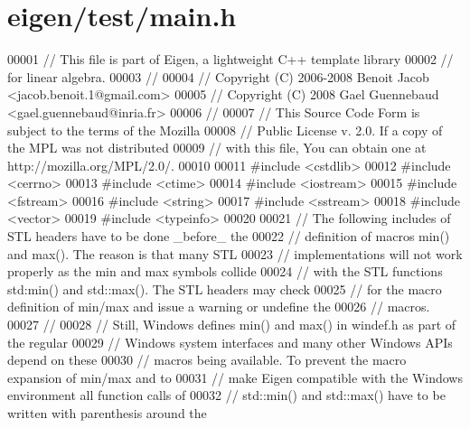 \hypertarget{eigen_2test_2main_8h_source}{}\section{eigen/test/main.h}
\label{eigen_2test_2main_8h_source}

\begin{DoxyCode}
00001 \textcolor{comment}{// This file is part of Eigen, a lightweight C++ template library}
00002 \textcolor{comment}{// for linear algebra.}
00003 \textcolor{comment}{//}
00004 \textcolor{comment}{// Copyright (C) 2006-2008 Benoit Jacob <jacob.benoit.1@gmail.com>}
00005 \textcolor{comment}{// Copyright (C) 2008 Gael Guennebaud <gael.guennebaud@inria.fr>}
00006 \textcolor{comment}{//}
00007 \textcolor{comment}{// This Source Code Form is subject to the terms of the Mozilla}
00008 \textcolor{comment}{// Public License v. 2.0. If a copy of the MPL was not distributed}
00009 \textcolor{comment}{// with this file, You can obtain one at http://mozilla.org/MPL/2.0/.}
00010 
00011 \textcolor{preprocessor}{#include <cstdlib>}
00012 \textcolor{preprocessor}{#include <cerrno>}
00013 \textcolor{preprocessor}{#include <ctime>}
00014 \textcolor{preprocessor}{#include <iostream>}
00015 \textcolor{preprocessor}{#include <fstream>}
00016 \textcolor{preprocessor}{#include <string>}
00017 \textcolor{preprocessor}{#include <sstream>}
00018 \textcolor{preprocessor}{#include <vector>}
00019 \textcolor{preprocessor}{#include <typeinfo>}
00020 
00021 \textcolor{comment}{// The following includes of STL headers have to be done \_before\_ the}
00022 \textcolor{comment}{// definition of macros min() and max().  The reason is that many STL}
00023 \textcolor{comment}{// implementations will not work properly as the min and max symbols collide}
00024 \textcolor{comment}{// with the STL functions std:min() and std::max().  The STL headers may check}
00025 \textcolor{comment}{// for the macro definition of min/max and issue a warning or undefine the}
00026 \textcolor{comment}{// macros.}
00027 \textcolor{comment}{//}
00028 \textcolor{comment}{// Still, Windows defines min() and max() in windef.h as part of the regular}
00029 \textcolor{comment}{// Windows system interfaces and many other Windows APIs depend on these}
00030 \textcolor{comment}{// macros being available.  To prevent the macro expansion of min/max and to}
00031 \textcolor{comment}{// make Eigen compatible with the Windows environment all function calls of}
00032 \textcolor{comment}{// std::min() and std::max() have to be written with parenthesis around the}

\end{DoxyCode}
